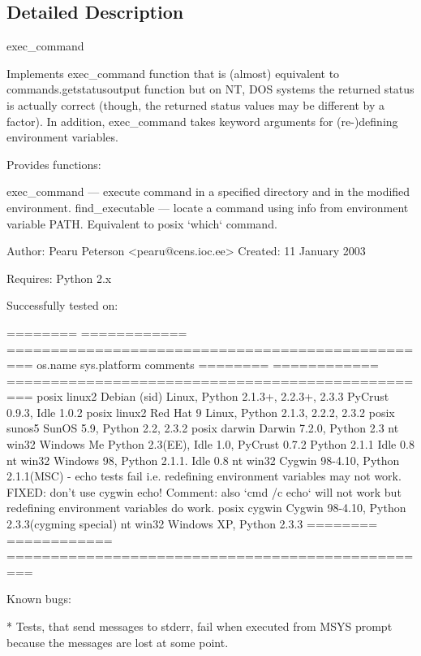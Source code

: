 \subsection{Detailed Description}
\begin{DoxyVerb}exec_command

Implements exec_command function that is (almost) equivalent to
commands.getstatusoutput function but on NT, DOS systems the
returned status is actually correct (though, the returned status
values may be different by a factor). In addition, exec_command
takes keyword arguments for (re-)defining environment variables.

Provides functions:

  exec_command  --- execute command in a specified directory and
            in the modified environment.
  find_executable --- locate a command using info from environment
            variable PATH. Equivalent to posix `which`
            command.

Author: Pearu Peterson <pearu@cens.ioc.ee>
Created: 11 January 2003

Requires: Python 2.x

Successfully tested on:

========  ============  =================================================
os.name   sys.platform  comments
========  ============  =================================================
posix     linux2        Debian (sid) Linux, Python 2.1.3+, 2.2.3+, 2.3.3
                PyCrust 0.9.3, Idle 1.0.2
posix     linux2        Red Hat 9 Linux, Python 2.1.3, 2.2.2, 2.3.2
posix     sunos5        SunOS 5.9, Python 2.2, 2.3.2
posix     darwin        Darwin 7.2.0, Python 2.3
nt        win32         Windows Me
                Python 2.3(EE), Idle 1.0, PyCrust 0.7.2
                Python 2.1.1 Idle 0.8
nt        win32         Windows 98, Python 2.1.1. Idle 0.8
nt        win32         Cygwin 98-4.10, Python 2.1.1(MSC) - echo tests
                fail i.e. redefining environment variables may
                not work. FIXED: don't use cygwin echo!
                Comment: also `cmd /c echo` will not work
                but redefining environment variables do work.
posix     cygwin        Cygwin 98-4.10, Python 2.3.3(cygming special)
nt        win32         Windows XP, Python 2.3.3
========  ============  =================================================

Known bugs:

* Tests, that send messages to stderr, fail when executed from MSYS prompt
  because the messages are lost at some point.\end{DoxyVerb}
 

